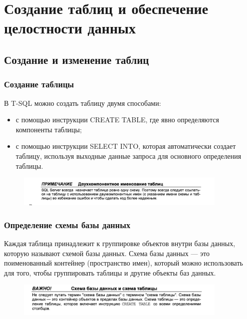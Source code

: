 \chapter{Создание таблиц и обеспечение целостности данных}
\section{Создание и изменение таблиц}

\subsection{Создание таблицы}
В T-SQL можно создать таблицу двумя способами: 
\begin{itemize}
	\item с помощью инструкции CREATE TABLE, где явно определяются компоненты таблицы; 
	\item с помощью инструкции SELECT INTO, которая автоматически создает таблицу,
	используя выходные данные запроса для основного определения таблицы. 
\end{itemize}

\begin{figure}[h!]
	\begin{center}
		\includegraphics[width=0.9\textwidth]{img/advice11.png}
	\end{center}
	\captionsetup{justification=centering}
\end{figure}

\subsection{Определение схемы базы данных}
Каждая таблица принадлежит к группировке объектов внутри базы данных,
которую называют схемой базы данных. Схема базы данных — это поименованный контейнер (пространство имен), который можно использовать для
того, чтобы группировать таблицы и другие объекты баз данных.

\begin{figure}[h!]
	\begin{center}
		\includegraphics[width=0.9\textwidth]{img/advice12.png}
	\end{center}
	\captionsetup{justification=centering}
\end{figure}

